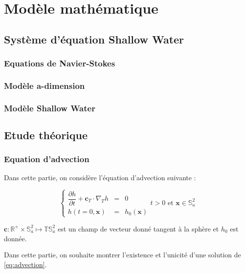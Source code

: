
\chapter{Modèle mathématique}

\section{Système d'équation Shallow Water}

\subsection{Equations de Navier-Stokes}

\subsection{Modèle a-dimension}

\subsection{Modèle Shallow Water}

\section{Etude théorique}

\subsection{Equation d'advection}

Dans cette partie, on considère l'équation d'advection suivante :

\begin{equation}
\left\lbrace
\begin{array}{rcl}
\dfrac{\partial h}{\partial t} + \mathbf{c}_T \cdot \nabla_T h & = & 0 \\
h(t=0,\mathbf{x}) & = & h_0(\mathbf{x})
\end{array}
\right. t>0 \text{ et } \mathbf{x} \in \mathbb{S}_a^2
\label{eq:advection}
\end{equation}

$\mathbf{c}:\mathbb{R}^+ \times \mathbb{S}_a^2 \mapsto \mathbb{T}\mathbb{S}_a^2$ est un champ de vecteur donné tangent à la sphère et $h_0$ est donnée.

Dans cette partie, on souhaite montrer l'existence et l'unicité d'une solution de \eqref{eq:advection}.

